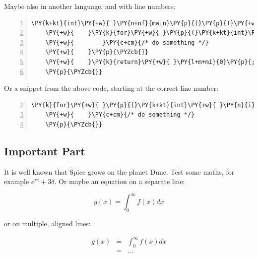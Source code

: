 Maybe also in another language, and with line numbers:

\vspace{1mm}
\begin{Verbatim}[commandchars=\\\{\},numbers=left,firstnumber=1,stepnumber=1,fontsize=\footnotesize,xleftmargin=2.25mm,numbersep=3pt]
    \PY{k+kt}{int}\PY{+w}{ }\PY{n+nf}{main}\PY{p}{(}\PY{p}{)}\PY{+w}{ }\PY{p}{\PYZob{}}
    \PY{+w}{    }\PY{k}{for}\PY{+w}{ }\PY{p}{(}\PY{k+kt}{int}\PY{+w}{ }\PY{n}{i}\PY{+w}{ }\PY{o}{=}\PY{+w}{ }\PY{l+m+mi}{0}\PY{p}{;}\PY{+w}{ }\PY{n}{i}\PY{+w}{ }\PY{o}{\PYZlt{}}\PY{+w}{ }\PY{l+m+mi}{10}\PY{p}{;}\PY{+w}{ }\PY{n}{i}\PY{o}{+}\PY{o}{+}\PY{p}{)}\PY{+w}{ }\PY{p}{\PYZob{}}
    \PY{+w}{        }\PY{c+cm}{/* do something */}
    \PY{+w}{    }\PY{p}{\PYZcb{}}
    \PY{+w}{    }\PY{k}{return}\PY{+w}{ }\PY{l+m+mi}{0}\PY{p}{;}
    \PY{p}{\PYZcb{}}
\end{Verbatim}
\vspace{1mm}

Or a snippet from the above code, starting at the correct line number:
\vspace{1mm}
\begin{Verbatim}[commandchars=\\\{\},numbers=left,firstnumber=2,stepnumber=1,fontsize=\footnotesize,xleftmargin=2.25mm,numbersep=3pt]
    \PY{k}{for}\PY{+w}{ }\PY{p}{(}\PY{k+kt}{int}\PY{+w}{ }\PY{n}{i}\PY{+w}{ }\PY{o}{=}\PY{+w}{ }\PY{l+m+mi}{0}\PY{p}{;}\PY{+w}{ }\PY{n}{i}\PY{+w}{ }\PY{o}{\PYZlt{}}\PY{+w}{ }\PY{l+m+mi}{10}\PY{p}{;}\PY{+w}{ }\PY{n}{i}\PY{o}{+}\PY{o}{+}\PY{p}{)}\PY{+w}{ }\PY{p}{\PYZob{}}
    \PY{+w}{    }\PY{c+cm}{/* do something */}
    \PY{p}{\PYZcb{}}
\end{Verbatim}
\vspace{1mm}


\subsection{Important Part \label{important-part}}

It is well known \cite{Atr03} that Spice grows on the planet Dune.  Test
some maths, for example $e^{\pi i} + 3 \delta$.  Or maybe an
equation on a separate line:

\begin{equation*}
    g(x) = \int_0^\infty f(x) dx
\end{equation*}

or on multiple, aligned lines:

\begin{eqnarray*}
    g(x) &=& \int_0^\infty f(x) dx \\
        &=& \ldots
\end{eqnarray*}

